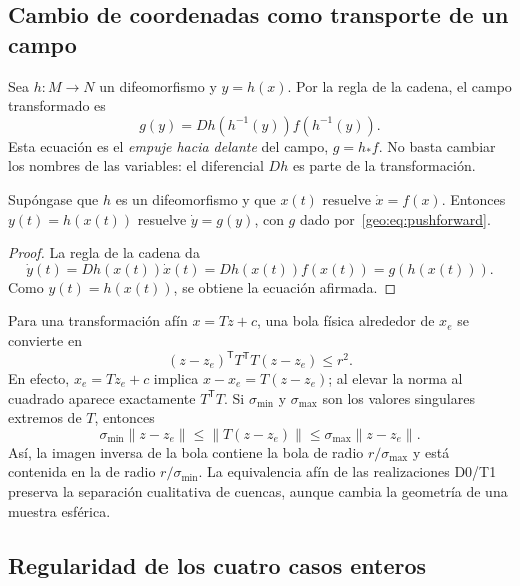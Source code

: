 \subsection{Cambio de coordenadas como transporte de un campo}

Sea \(h:M\to N\) un difeomorfismo y \(y=h(x)\). Por la regla de la cadena,
el campo transformado es
\begin{equation}
  g(y)=D h(h^{-1}(y))f(h^{-1}(y)).
  \label{geo:eq:pushforward}
\end{equation}
Esta ecuación es el \emph{empuje hacia delante} del campo, \(g=h_*f\). No
basta cambiar los nombres de las variables: el diferencial \(Dh\) es parte de
la transformación.

\begin{proposition}
Supóngase que \(h\) es un difeomorfismo y que \(x(t)\) resuelve
\(\dot x=f(x)\). Entonces \(y(t)=h(x(t))\) resuelve
\(\dot y=g(y)\), con \(g\) dado por~\eqref{geo:eq:pushforward}.
\end{proposition}

\begin{proof}
La regla de la cadena da
\[
 \dot y(t)=Dh(x(t))\dot x(t)=Dh(x(t))f(x(t))=g(h(x(t))).
\]
Como \(y(t)=h(x(t))\), se obtiene la ecuación afirmada.
\end{proof}

Para una transformación afín \(x=Tz+c\), una bola física alrededor de
\(x_e\) se convierte en
\begin{equation}
 (z-z_e)^{\mathsf T}T^{\mathsf T}T(z-z_e)\le r^2.
 \label{geo:eq:ball-to-ellipsoid}
\end{equation}
En efecto, \(x_e=Tz_e+c\) implica \(x-x_e=T(z-z_e)\); al elevar la
norma al cuadrado aparece exactamente \(T^{\mathsf T}T\). Si
\(\sigma_{\min}\) y \(\sigma_{\max}\) son los valores singulares extremos
de \(T\), entonces
\[
 \sigma_{\min}\|z-z_e\|\le\|T(z-z_e)\|
 \le\sigma_{\max}\|z-z_e\|.
\]
Así, la imagen inversa de la bola contiene la bola de radio
\(r/\sigma_{\max}\) y está contenida en la de radio
\(r/\sigma_{\min}\). La equivalencia afín de las realizaciones D0/T1
preserva la separación cualitativa de cuencas, aunque cambia la geometría
de una muestra esférica.

\subsection{Regularidad de los cuatro casos enteros}

